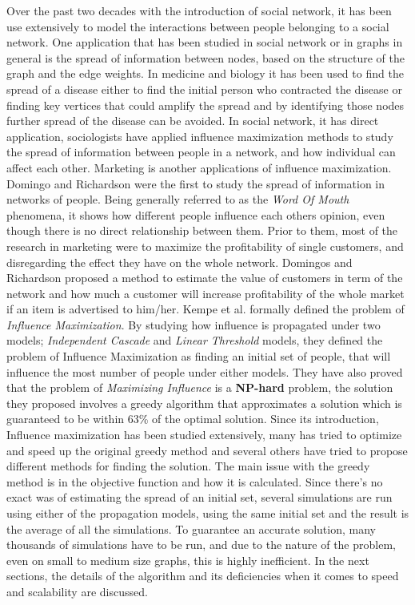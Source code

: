 \documentclass[english]{tktltiki}
\begin{document}
Over the past two decades with the introduction of social network, it has been use extensively to model the interactions between people belonging to a social network. One application that has been studied in social network or in graphs in general is the spread of information between nodes, based on the structure of the graph and the edge weights. In medicine and biology it has been used to find the spread of a disease either to find the initial person who contracted the disease or finding key vertices that could amplify the spread and by identifying those nodes further spread of the disease can be avoided. In social network, it has direct application, sociologists have applied influence maximization methods to study the spread of information between people in a network, and how individual can affect each other. Marketing is another applications of influence maximization.  Domingo and Richardson \cite{domingo01} were the first to study the spread of information in networks of people. Being generally referred to as the \textit{Word Of Mouth} phenomena, it shows how different people influence each others opinion, even though there is no direct relationship between them. Prior to them, most of the research in marketing were to maximize the profitability of single customers, and disregarding the effect they have on the whole network. Domingos and Richardson proposed a method to estimate the value of customers in term of the network and how much a customer will increase profitability of the whole market if an item is advertised to him/her. Kempe et al. \cite{kempe03} formally defined the problem of \textit{Influence Maximization}. By studying how influence is propagated under two models; \textit{Independent Cascade} and \textit{Linear Threshold} models, they defined the problem of Influence Maximization as finding an initial set of people, that will influence the most number of people under either models. They have also proved that the problem of \textit{Maximizing Influence} is a \textbf{NP-hard} problem, the solution they proposed involves a greedy algorithm that approximates a solution which is guaranteed to be within 63\%  of the optimal solution. Since its introduction, Influence maximization has been studied extensively, many has tried to optimize and speed up the original greedy method and several others have tried to propose different methods for finding the solution. The main issue with the greedy method is in the objective function and how it is calculated. Since there's no exact was of estimating the spread of an initial set, several simulations are run using either of the propagation models, using the same initial set and the result is the average of all the simulations. To guarantee an accurate solution, many thousands of simulations have to be run, and due to the nature of the problem, even on small to medium size graphs, this is highly inefficient. In the next sections, the details of the algorithm and its deficiencies when it comes to speed and scalability are discussed. \\
\end{document}
